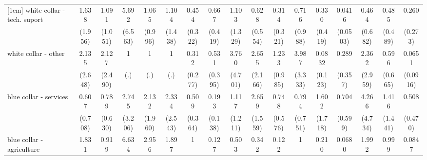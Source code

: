 {\begin{tabular}{l*{16}{c}}
[1em]
white collar - tech. suport&       1.638         &       1.091         &       5.692         &       1.065         &       1.104         &       0.454         &       0.667         &       1.103         &       0.628         &       0.314         &       0.716         &       0.330         &      0.0416\sym{**} &       0.464         &       0.485         &       0.260         \\
                    &     (1.956)         &     (1.051)         &     (6.563)         &     (0.996)         &     (1.438)         &     (0.322)         &     (0.419)         &     (1.329)         &     (0.554)         &     (0.321)         &     (0.988)         &     (0.419)         &    (0.0503)         &     (0.682)         &     (0.489)         &     (0.273)         \\
[1em]
white collar - other&       2.135         &       2.127         &           1         &           1         &           1         &       0.312         &       0.531         &       3.760         &       2.655         &       1.233         &       3.987         &      0.0832         &       0.289         &       2.362         &       0.596         &      0.0651         \\
                    &     (2.648)         &     (2.490)         &         (.)         &         (.)         &         (.)         &     (0.277)         &     (0.395)         &     (4.701)         &     (2.166)         &     (0.985)         &     (3.333)         &     (0.123)         &     (0.357)         &     (2.959)         &     (0.665)         &    (0.0916)         \\
[1em]
blue collar - services&       0.607         &       0.789         &       2.745         &       2.132         &       2.334         &       0.509         &       0.193\sym{*}  &       1.117         &       2.659         &       0.748         &       0.794         &       1.602         &       0.704         &       4.266         &       1.416         &       0.508         \\
                    &     (0.708)         &     (0.630)         &     (3.206)         &     (1.960)         &     (2.543)         &     (0.364)         &     (0.138)         &     (1.211)         &     (1.559)         &     (0.576)         &     (0.751)         &     (1.718)         &     (0.599)         &     (4.734)         &     (1.441)         &     (0.470)         \\
[1em]
blue collar - agriculture&       1.831         &       0.919         &       6.634         &       2.956         &       1.897         &           1         &       0.127         &       0.503         &       0.342         &       0.122         &           1         &       0.210         &      0.0680\sym{*}  &       1.992         &       0.999         &      0.0847         \\

\end{tabular}}
